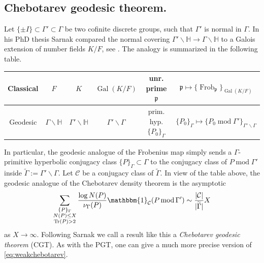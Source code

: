 \documentclass{article}
\theoremstyle{named}
\newcommand{\C}{\mathcal{C}}
\newcommand{\Hyp}{\mathbb{H}}
\newcommand{\N}{\mathcal{N}}
\DeclareMathOperator{\Gal}{Gal}
\DeclareMathOperator{\Frob}{Frob}
\DeclareMathOperator{\Tr}{Tr}
\DeclareMathOperator{\modulo}{mod}
\begin{document}
\subsection{Chebotarev geodesic theorem.}\label{subsec:chebotarevGL2}
Let $\{\pm I\} \subset \Gamma' \subset \Gamma$ be two cofinite discrete groups, such that $\Gamma'$ is normal in $\Gamma$. In his PhD thesis Sarnak compared the normal covering $\Gamma'\backslash \Hyp \rightarrow \Gamma\backslash \Hyp$ to a Galois extension of number fields $K/F$, see \cite[section 3]{sarnakthesis}. The analogy is summarized in the following table. 
\begin{center}
\begin{tabular}{|c|c|c|c|c|c|}
    \hline
Classical &$F$ & $K$ & $\Gal(K/F)$ & unr. prime $\mathfrak{p}$ & $\mathfrak{p} \mapsto \{\Frob_\mathfrak{p}\}_{\Gal(K/F)}$\\
\hline
Geodesic & $\Gamma \backslash \Hyp$ & $\Gamma' \backslash \Hyp$ & $\Gamma'\backslash \Gamma$ &  prim. hyp. $\{P_0\}_\Gamma$ & $\{P_0\}_\Gamma \mapsto \{P_0 \modulo \Gamma'\}_{\Gamma'\backslash \Gamma}$\\
\hline
\end{tabular}
\end{center}
In particular, the geodesic analogue of the Frobenius map simply sends a $\Gamma$-primitive hyperbolic conjugacy class $\{P\}_\Gamma \subset \Gamma$ to the conjugacy class of $P \modulo \Gamma'$ inside $\widetilde{\Gamma} := \Gamma'\backslash \Gamma$. Let $\mathcal{C}$ be a conjugacy class of $\widetilde{\Gamma}$. In view of the table above, the geodesic analogue of the Chebotarev density theorem is the asymptotic
\begin{equation}\label{eq:weakchebotarev}
    \sum_{\substack{\{P\}_{\Gamma}\\N(P)\leq X\\
    \Tr(P) > 2}}\frac{\log N(P)}{\nu_\Gamma(P)} \mathbbm{1}_{\C}(P \modulo \Gamma') \sim \frac{|\C|}{|\widetilde{\Gamma}|}X
\end{equation}
as $X \to \infty$. Following Sarnak we call a result like this a \emph{Chebotarev geodesic theorem} (CGT). As with the PGT, one can give a much more precise version of \eqref{eq:weakchebotarev}.
\end{document}
